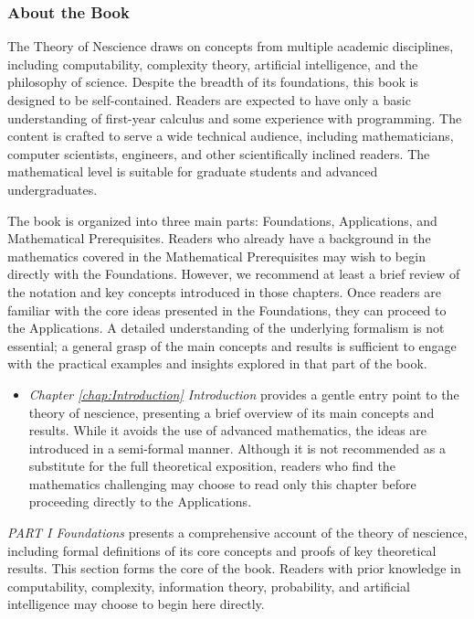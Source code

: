 %
%

\subsubsection*{About the Book}

The Theory of Nescience draws on concepts from multiple academic disciplines, including computability, complexity theory, artificial intelligence, and the philosophy of science. Despite the breadth of its foundations, this book is designed to be self-contained. Readers are expected to have only a basic understanding of first-year calculus and some experience with programming. The content is crafted to serve a wide technical audience, including mathematicians, computer scientists, engineers, and other scientifically inclined readers. The mathematical level is suitable for graduate students and advanced undergraduates.

The book is organized into three main parts: Foundations, Applications, and Mathematical Prerequisites. Readers who already have a background in the mathematics covered in the Mathematical Prerequisites may wish to begin directly with the Foundations. However, we recommend at least a brief review of the notation and key concepts introduced in those chapters. Once readers are familiar with the core ideas presented in the Foundations, they can proceed to the Applications. A detailed understanding of the underlying formalism is not essential; a general grasp of the main concepts and results is sufficient to engage with the practical examples and insights explored in that part of the book.

\bigskip

\begin{itemize}

\item \emph{Chapter \ref{chap:Introduction} Introduction} provides a gentle entry point to the theory of nescience, presenting a brief overview of its main concepts and results. While it avoids the use of advanced mathematics, the ideas are introduced in a semi-formal manner. Although it is not recommended as a substitute for the full theoretical exposition, readers who find the mathematics challenging may choose to read only this chapter before proceeding directly to the Applications.

\end{itemize}

\bigskip

\emph{PART I Foundations} presents a comprehensive account of the theory of nescience, including formal definitions of its core concepts and proofs of key theoretical results. This section forms the core of the book. Readers with prior knowledge in computability, complexity, information theory, probability, and artificial intelligence may choose to begin here directly.

